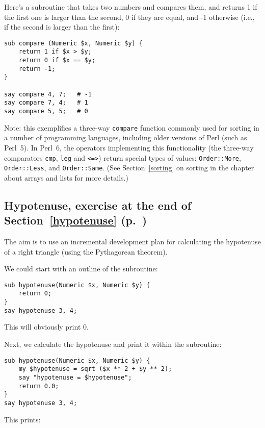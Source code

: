 Here's a subroutine that takes two numbers and compares them, 
and returns 1 if the first one is larger than the second, 0 if 
they are equal, and -1 otherwise (i.e., if the second is larger 
than the first):

\begin{verbatim}
sub compare (Numeric $x, Numeric $y) {
    return 1 if $x > $y;
    return 0 if $x == $y;
    return -1;
}

say compare 4, 7;   # -1
say compare 7, 4;   # 1
say compare 5, 5;   # 0
\end{verbatim}

Note: this exemplifies a three-way {\tt compare} function 
commonly used for sorting in a number of programming 
languages, including older versions of Perl (such as 
Perl~5). In Perl~6, the operators implementing this 
functionality (the three-way comparators \verb'cmp', 
\verb'leg' and \verb'<=>') return special types of 
values: {\tt Order::More}, {\tt Order::Less}, and 
{\tt Order::Same}. (See Section~\ref{sorting} 
\ifplastex \else
on sorting in the chapter about arrays and lists 
\fi
for more details.)

\subsection{Hypotenuse, exercise at the end of Section~\ref{hypotenuse} (p.~\pageref{hypotenuse})}
\label{sol_hypotenuse}

The aim is to use an incremental development plan for 
calculating the hypotenuse of a right triangle (using 
the Pythagorean theorem). 

We could start with an outline of the subroutine:

\begin{verbatim}
sub hypotenuse(Numeric $x, Numeric $y) {
    return 0;
}
say hypotenuse 3, 4;
\end{verbatim}
%

This will obviously print 0.

Next, we calculate the hypotenuse and print it within the subroutine:

\begin{verbatim}
sub hypotenuse(Numeric $x, Numeric $y) {
    my $hypotenuse = sqrt ($x ** 2 + $y ** 2);
    say "hypotenuse = $hypotenuse";
    return 0.0;
}
say hypotenuse 3, 4;
\end{verbatim}
%

This prints:

